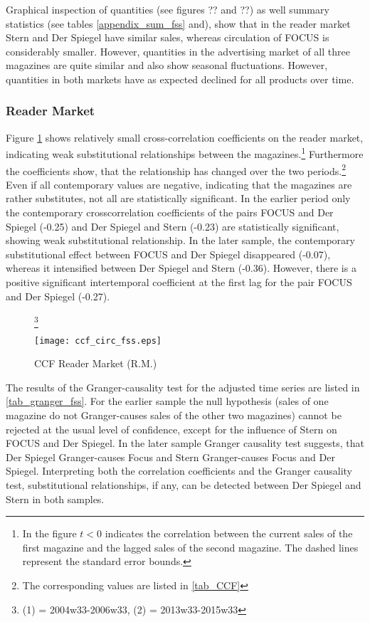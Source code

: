 \documentclass[12pt,a4paper]{scrreprt}
\begin{document}
Graphical inspection of quantities (see figures ?? and ??) as well summary statistics (see tables \ref{appendix_sum_fss} and), show that in the reader market Stern and Der Spiegel have similar sales, whereas circulation of FOCUS is considerably smaller. However, quantities in the advertising market of all three magazines are quite similar and also show seasonal fluctuations. However, quantities in both markets have as expected declined for all products over time.  

\subsubsection{Reader Market}
Figure \ref{fig_ccf_circ_fss} shows relatively small cross-correlation coefficients on the reader market, indicating weak substitutional relationships between the magazines.\footnote{In the figure $t<0$ indicates the correlation between the current sales of the first magazine and the lagged sales of the second magazine. The dashed lines represent the standard error bounds.} Furthermore the coefficients show, that the relationship has changed over the two periods.\footnote{The corresponding values are listed in \ref{tab_CCF}} Even if all contemporary values are negative, indicating that the magazines are rather substitutes, not all are statistically significant. In the earlier period only the contemporary crosscorrelation coefficients of the pairs FOCUS and Der Spiegel (-0.25) and Der Spiegel and Stern (-0.23) are statistically significant, showing weak substitutional relationship. In the later sample, the contemporary substitutional effect between FOCUS and Der Spiegel disappeared (-0.07), whereas it intensified between Der Spiegel and Stern (-0.36). However, there is a positive significant intertemporal coefficient at the first lag for the pair FOCUS and Der Spiegel (-0.27). \\

\begin{figure}[H]\footnote{(1) = 2004w33-2006w33, (2) = 2013w33-2015w33}
\caption{CCF Reader Market (R.M.)}
\label{fig_ccf_circ_fss}
	\centering
	\texttt{[image: ccf\_circ\_fss.eps]}
\end{figure}

The results of the Granger-causality test for the adjusted time series are listed in \ref{tab_granger_fss}. For the earlier sample the null hypothesis (sales of one magazine do not Granger-causes sales of the other two magazines) cannot be rejected at the usual level of confidence, except for the  influence of Stern on FOCUS and Der Spiegel. In the later sample Granger causality test suggests, that Der Spiegel Granger-causes Focus and Stern Granger-causes Focus and Der Spiegel. Interpreting both the correlation coefficients and the Granger causality test, substitutional relationships, if any, can be detected between Der Spiegel and Stern in both samples. 
\end{document}
